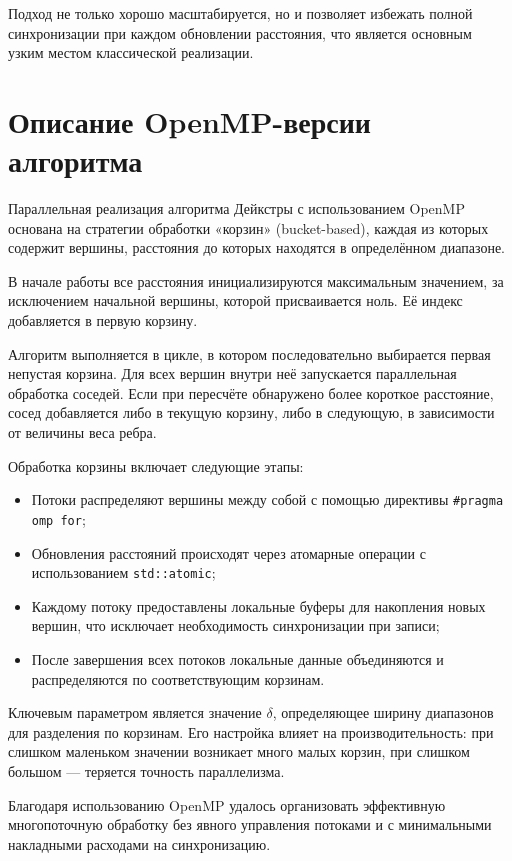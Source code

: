 \documentclass[12pt,a4paper]{extarticle}
\begin{document}
Подход не только хорошо масштабируется, но и позволяет избежать полной синхронизации при
каждом обновлении расстояния, что является основным узким местом классической реализации.

\section{Описание OpenMP-версии алгоритма}

Параллельная реализация алгоритма Дейкстры с использованием OpenMP основана на стратегии
обработки «корзин» (bucket-based), каждая из которых содержит вершины, расстояния до которых
находятся в определённом диапазоне.

В начале работы все расстояния инициализируются максимальным значением, за исключением
начальной вершины, которой присваивается ноль. Её индекс добавляется в первую корзину.

Алгоритм выполняется в цикле, в котором последовательно выбирается первая непустая корзина.
Для всех вершин внутри неё запускается параллельная обработка соседей. Если при пересчёте
обнаружено более короткое расстояние, сосед добавляется либо в текущую корзину, либо в
следующую, в зависимости от величины веса ребра.

Обработка корзины включает следующие этапы:

\begin{itemize}
    \item Потоки распределяют вершины между собой с помощью директивы \texttt{\#pragma omp for};
    \item Обновления расстояний происходят через атомарные операции с использованием
    \texttt{std::atomic};
    \item Каждому потоку предоставлены локальные буферы для накопления новых вершин,
    что исключает необходимость синхронизации при записи;
    \item После завершения всех потоков локальные данные объединяются и распределяются
    по соответствующим корзинам.
\end{itemize}

Ключевым параметром является значение $\delta$, определяющее ширину диапазонов для
разделения по корзинам. Его настройка влияет на производительность: при слишком маленьком
значении возникает много малых корзин, при слишком большом — теряется точность параллелизма.

Благодаря использованию OpenMP удалось организовать эффективную многопоточную обработку
без явного управления потоками и с минимальными накладными расходами на синхронизацию.
\end{document}
